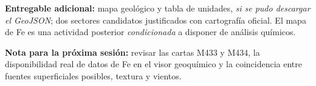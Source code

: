 \documentclass[11pt,a4paper]{article}
\begin{document}
\textbf{Entregable adicional:} mapa geológico y tabla de unidades,
\emph{si se pudo descargar el GeoJSON}; dos sectores candidatos
justificados con cartografía oficial. El mapa de Fe es una actividad
posterior \emph{condicionada} a disponer de análisis químicos.

\textbf{Nota para la próxima sesión:} revisar las cartas M433 y M434,
la disponibilidad real de datos de Fe en el visor geoquímico y la
coincidencia entre fuentes superficiales posibles, textura y vientos.
\end{document}
